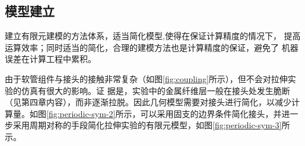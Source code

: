 %
\subsection{模型建立}

建立有限元建模的方法体系，适当简化模型,使得在保证计算精度的情况下， 提高运算效率；同时适当的简化，合理的建模方法也是计算精度的保证，避免了 机器误差在计算工程中累积。

由于软管组件与接头的接触非常复杂（如图\ref{fig:coupling}所示），但不会对拉伸实验的仿真有很大的影响。证 据是，实验中的金属纤维层一般在接头处发生脆断（见第四章内容），而非逐渐拉脱。因此几何模型需要对接头进行简化，以减少计算量。如图\ref{fig:periodic-sym-2}所示，可以采用固支的边界条件简化接头，并进一步采用周期对称的手段简化拉伸实验的有限元模型，如图\ref{fig:periodic-sym-3}所示。


\begin{figure}[!htp]
\centering
{}
\end{figure}





